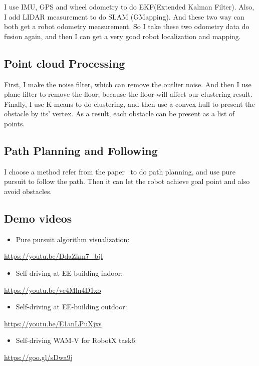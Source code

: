 \documentclass[letterpaper, 10 pt, conference]{ieeeconf}  %
\newcommand\tab[1][1cm]{\hspace*{#1}}
\begin{document}
I use IMU, GPS and wheel odometry to do EKF(Extended Kalman Filter). Also, I add LIDAR measurement to do SLAM (GMapping). And these two way can both get a robot odometry measurement. So I take these two odometry data do fusion again, and then I can get a very good robot localization and mapping.

\subsection{Point cloud Processing}

First, I make the noise filter, which can remove the outlier noise. And then I use plane filter to remove the floor, because the floor will affect our clustering result. Finally, I use K-means to do clustering, and then use a convex hull to present the obstacle by its' vertex. As a result, each obstacle can be present as a list of points.

\subsection{Path Planning and Following}

I choose a method refer from the paper~\cite{1527001} to do path planning, and use pure pursuit to follow the path. Then it can let the robot achieve goal point and also avoid obstacles.

\subsection{Demo videos} 
\begin{itemize}
\item Pure pursuit algorithm visualization: 
\end{itemize}
\tab\url{https://youtu.be/DdaZkm7_bjI}
\begin{itemize}
\item Self-driving at EE-building indoor: 
\end{itemize}
\tab\url{https://youtu.be/ve4Mln4D1xo}
\begin{itemize}
\item Self-driving at EE-building outdoor: 
\end{itemize}
\tab\url{https://youtu.be/E1anLPuXjxs}
\begin{itemize}
\item Self-driving WAM-V for RobotX task6: 
\end{itemize}
\tab\url{https://goo.gl/sDwa9j}

\addtolength{\textheight}{-12cm}   %



\end{document}
